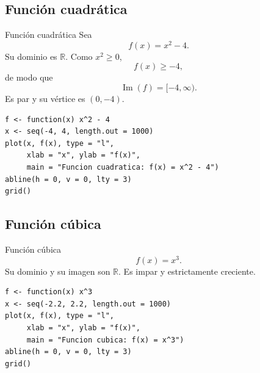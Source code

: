 \documentclass[aspectratio=169,10pt]{beamer}
\newcommand{\R}{\mathbb{R}}
\newcommand{\Ima}{\operatorname{Im}}
\begin{document}
\subsection*{Función cuadrática}
\begin{frame}{Función cuadrática}
Sea
\[
f(x)=x^2-4.
\]
Su dominio es $\R$. Como $x^2\geq0$,
\[
f(x)\geq-4,
\]
de modo que
\[
\Ima(f)=[-4,\infty).
\]
Es par y su vértice es $(0,-4)$.

\begin{center}
\end{center}

\begin{verbatim}
f <- function(x) x^2 - 4
x <- seq(-4, 4, length.out = 1000)
plot(x, f(x), type = "l",
     xlab = "x", ylab = "f(x)",
     main = "Funcion cuadratica: f(x) = x^2 - 4")
abline(h = 0, v = 0, lty = 3)
grid()
\end{verbatim}

\end{frame}
\subsection*{Función cúbica}
\begin{frame}{Función cúbica}
\[
f(x)=x^3.
\]
Su dominio y su imagen son $\R$. Es impar y estrictamente creciente.

\begin{center}
\end{center}

\begin{verbatim}
f <- function(x) x^3
x <- seq(-2.2, 2.2, length.out = 1000)
plot(x, f(x), type = "l",
     xlab = "x", ylab = "f(x)",
     main = "Funcion cubica: f(x) = x^3")
abline(h = 0, v = 0, lty = 3)
grid()
\end{verbatim}

\end{frame}
\end{document}
